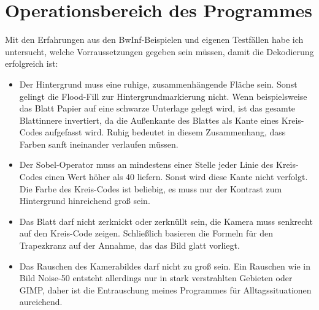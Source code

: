 \section {Operationsbereich des Programmes}
Mit den Erfahrungen aus den BwInf-Beispielen und eigenen Testfällen habe ich untersucht, welche Vorraussetzungen gegeben sein müssen, damit die Dekodierung erfolgreich ist:
\begin{itemize}
	\item Der Hintergrund muss eine ruhige, zusammenhängende Fläche sein. Sonst gelingt die Flood-Fill zur Hintergrundmarkierung nicht. Wenn beispielsweise das Blatt Papier auf eine schwarze Unterlage gelegt wird, ist das gesamte Blattinnere invertiert, da die Außenkante des Blattes als Kante eines Kreis-Codes aufgefasst wird. Ruhig bedeutet in diesem Zusammenhang, dass Farben sanft ineinander verlaufen müssen.
	\item Der Sobel-Operator muss an mindestens einer Stelle jeder Linie des Kreis-Codes einen Wert höher als 40 liefern. Sonst wird diese Kante nicht verfolgt. Die Farbe des Kreis-Codes ist beliebig, es muss nur der Kontrast zum Hintergrund hinreichend groß sein.
	\item Das Blatt darf nicht zerknickt oder zerknüllt sein, die Kamera muss senkrecht auf den Kreis-Code zeigen. Schließlich basieren die Formeln für den Trapezkranz auf der Annahme, das das Bild glatt vorliegt. 
	\item Das Rauschen des Kamerabildes darf nicht zu groß sein. Ein Rauschen wie in Bild Noise-50 entsteht allerdings nur in stark verstrahlten Gebieten oder GIMP, daher ist die Entrauschung meines Programmes für Alltagssituationen aureichend.
\end{itemize}